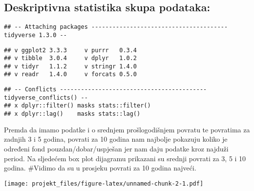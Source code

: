 \documentclass[
]{article}
\newenvironment{Shaded}{\begin{snugshade}}{\end{snugshade}}
\newcommand{\DataTypeTok}[1]{\textcolor[rgb]{0.13,0.29,0.53}{#1}}
\newcommand{\KeywordTok}[1]{\textcolor[rgb]{0.13,0.29,0.53}{\textbf{#1}}}
\newcommand{\NormalTok}[1]{#1}
\newcommand{\OperatorTok}[1]{\textcolor[rgb]{0.81,0.36,0.00}{\textbf{#1}}}
\newcommand{\StringTok}[1]{\textcolor[rgb]{0.31,0.60,0.02}{#1}}
\begin{document}
\hypertarget{deskriptivna-statistika-skupa-podataka}{%
\subsection{Deskriptivna statistika skupa
podataka:}\label{deskriptivna-statistika-skupa-podataka}}

\begin{verbatim}
## -- Attaching packages --------------------------------------- tidyverse 1.3.0 --
\end{verbatim}

\begin{verbatim}
## v ggplot2 3.3.3     v purrr   0.3.4
## v tibble  3.0.4     v dplyr   1.0.2
## v tidyr   1.1.2     v stringr 1.4.0
## v readr   1.4.0     v forcats 0.5.0
\end{verbatim}

\begin{verbatim}
## -- Conflicts ------------------------------------------ tidyverse_conflicts() --
## x dplyr::filter() masks stats::filter()
## x dplyr::lag()    masks stats::lag()
\end{verbatim}

Premda da imamo podatke i o srednjem prošlogodišnjem povratu te
povratima za zadnjih 3 i 5 godina, povrati za 10 godina nam najbolje
pokazuju koliko je određeni fond pouzdan/dobar/uspješan jer nam daju
podatke kroz najduži period. Na sljedećem box plot dijagramu prikazani
su srednji povrati za 3, 5 i 10 godina. \#Vidimo da su u prosjeku
povrati za 10 godina najveći.

\begin{Shaded}
\end{Shaded}

\texttt{[image: projekt\_files/figure-latex/unnamed-chunk-2-1.pdf]}
\end{document}
